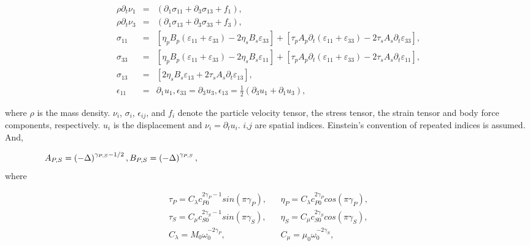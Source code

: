 \begin{eqnarray}                  
\rho \partial _t\nu _1 &=& \left (  \partial _1 \sigma_{11}+\partial _3 \sigma_{13}+f_1\right ),\label{eq:eq1}\\                   
\rho \partial _t\nu _3 &=& \left (  \partial _1 \sigma_{13}+\partial_3 \sigma_{33}+f_3\right ),\label{eq:eq2}\\                  
\sigma _{11} &=& \left [ \eta _pB_p(\varepsilon_{11}+\varepsilon_{33} )-2\eta _sB_s\varepsilon_{33}  \right ] + \left [ \tau _pA_p\partial _t (\varepsilon_{11}+\varepsilon_{33} )-2\tau _sA_s\partial _t \varepsilon_{33} \right ],\label{eq:eq3} \\
\sigma _{33} &=& \left [ \eta _pB_p(\varepsilon_{11}+\varepsilon_{33} )-2\eta _sB_s\varepsilon_{11}  \right ] + \left [ \tau _pA_p\partial _t (\varepsilon_{11}+\varepsilon_{33} )-2\tau _sA_s\partial _t \varepsilon_{11} \right ],\label{eq:eq4}\\        
\sigma _{13} &=& \left [ 2\eta _sB_s\varepsilon_{13}+2\tau _sA_s\partial _t \varepsilon_{13} \right ],\label{eq:eq5}\\              
\epsilon _{11} &=& \partial _1 u_1,\epsilon _{33}=\partial _3 u_3,\epsilon _{13}=\frac{1}{2}\left ( \partial _3 u_1+\partial _1 u_3 \right ),\label{eq:eq6}
\end{eqnarray}

where $\rho$ is the mass density. $\nu_i$, $\sigma_i$, $\epsilon_{ij}$, and $f_i$ denote the particle velocity tensor, the stress tensor, the strain tensor and body force components, respectively. $u_i$ is the displacement and $\nu_i=\partial_tu_i$. $i$,$j$ are spatial indices. Einstein’s convention of repeated indices is assumed. And,

\begin{equation}
\label{eq:eq7}                      
\hspace{0pt} A_{P,S}=\left ( -\Delta  \right )^{\gamma _{P,S}-1/2},B_{P,S}=\left ( -\Delta  \right )^{\gamma _{P,S}},\hspace{\linewidth minus\linewidth}
\end{equation}
where

\begin{eqnarray}
\label{eq:eq8}
\tau_P = C_{\lambda} c_{P0}^{2\gamma_P-1}sin(\pi\gamma_P ),&& \eta_P=C_\lambda c_{P0}^{2\gamma_P}cos(\pi\gamma_P ),\nonumber \\
\tau_S = C_\mu c_{S0}^{2\gamma_S-1}sin(\pi\gamma_S ),&& \eta_S=C_\mu c_{S0}^{2\gamma_S}cos(\pi\gamma_S ),\nonumber \\
C_{\lambda}=M_{0}\omega_0^{-2\gamma_P}, && C_\mu=\mu_{0}\omega_0^{-2\gamma_S},
\end{eqnarray}

